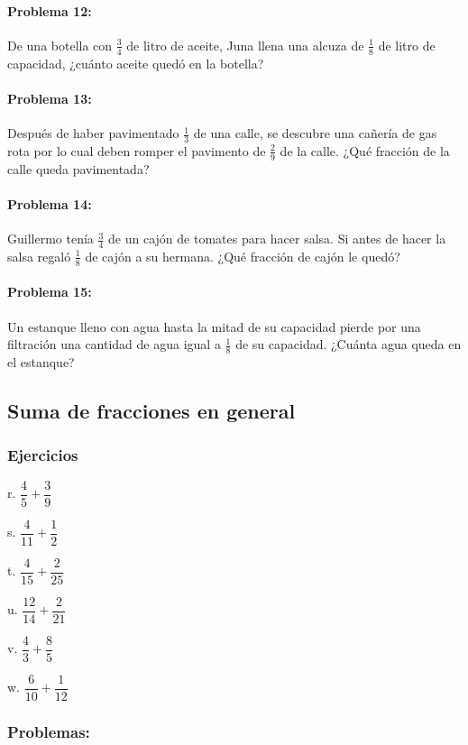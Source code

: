 \documentclass[10pt,twoside]{article}
\begin{document}
\paragraph*{Problema 12:} De una botella con $\frac{3}{4}$ de litro de aceite, Juna llena una alcuza de $\frac{1}{8}$ de litro de capacidad, ¿cuánto aceite quedó en la botella?
\paragraph*{Problema 13:} Después de haber pavimentado $\frac{1}{3}$ de una calle, se descubre una cañería de gas rota por lo cual deben romper el pavimento de $\frac{2}{9}$ de la calle. ¿Qué fracción de la calle queda pavimentada?
\paragraph*{Problema 14:} Guillermo tenía $\frac{3}{4}$ de un cajón de tomates para hacer salsa. Si antes de hacer la salsa regaló $\frac{1}{8}$ de cajón a su hermana. ¿Qué fracción de cajón le quedó?
\paragraph*{Problema 15:} Un estanque lleno con agua hasta la mitad de su capacidad pierde por una filtración una cantidad de agua igual a $\frac{1}{8}$ de su capacidad. ¿Cuánta agua queda en el estanque?
\subsection*{Suma de fracciones en general}
\subsubsection*{Ejercicios}
\begin{enumerate}
\begin{multicols}{3}
\item[r.] $\dfrac{4}{5}+\dfrac{3}{9}$
\item[s.] $\dfrac{4}{11}+\dfrac{1}{2}$
\item[t.] $\dfrac{4}{15}+\dfrac{2}{25}$
\item[u.] $\dfrac{12}{14}+\dfrac{2}{21}$
\item[v.] $\dfrac{4}{3}+\dfrac{8}{5}$
\item[w.] $\dfrac{6}{10}+\dfrac{1}{12}$
\end{multicols}
\end{enumerate}
\subsubsection*{Problemas:}
\end{document}
